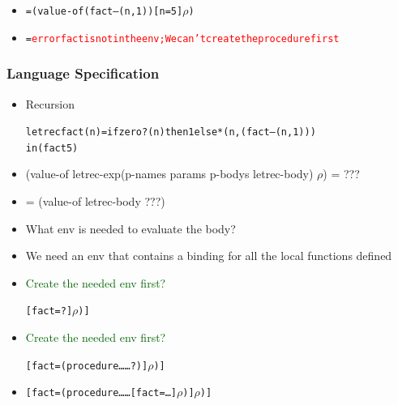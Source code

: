 \documentclass{beamer}
\begin{document}
\begin{frame}[fragile]
\begin{tiny}
\begin{itemize}
\item<9->
\begin{alltt}
= (value-of (fact –(n, 1)) \texttt{[}n=5\texttt{]}\(\rho\))
\end{alltt}

\item<10->
\begin{alltt}
= \textcolor{red}{error fact is not in the env; We can't create the procedure first}
\end{alltt}

\end{itemize}
\end{tiny}
\end{frame}

\begin{frame}[fragile]
\frametitle{Language Specification}
\begin{tiny}
\begin{itemize}
\item<1-> Recursion
\begin{alltt}
letrec fact(n) = if zero?(n) then 1 else *(n, (fact –(n, 1)))
in (fact 5)
\end{alltt}

\item<1-> (value-of letrec-exp(p-names params p-bodys letrec-body) $\rho$) = ???

\item<1-> = (value-of letrec-body ???)

\item<1-> What env is needed to evaluate the body?

\item<1-> We need an env that contains a binding for all the local functions defined

\item<1-> \textcolor{darkgreen}{Create the needed env first?}
\begin{alltt}
\texttt{[}fact=?\texttt{]}\(\rho\))\texttt{]}
\end{alltt}

\item<2-> \textcolor{darkgreen}{Create the needed env first?}
\begin{alltt}
\texttt{[}fact=(procedure \ldots \ldots ?)\texttt{]}\(\rho\))\texttt{]}
\end{alltt}

\item<3->
\begin{alltt}
\texttt{[}fact=(procedure \ldots \ldots \texttt{[}fact=\dots\texttt{]}\(\rho\))\texttt{]}\(\rho\))\texttt{]}
\end{alltt}


\end{itemize}
\end{tiny}
\end{frame}
\end{document}
